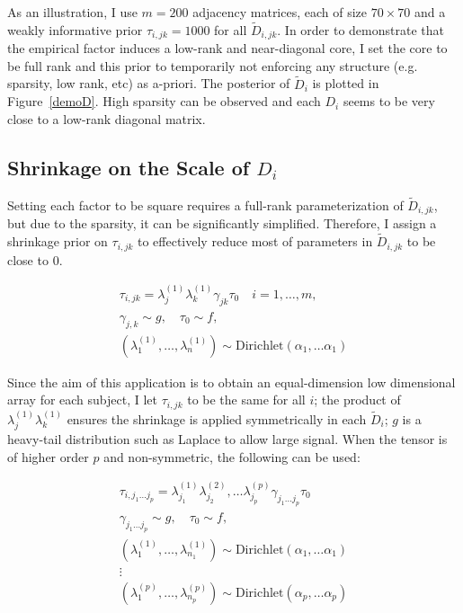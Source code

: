 \documentclass[10pt]{article}
\newcommand{\be}{\begin{equation}\begin{aligned}}
\newcommand{\ee}{\end{aligned}\end{equation}}
\begin{document}
As an illustration, I use $m=200$ adjacency matrices, each of size $70 \times 70$ and a weakly informative prior $\tau_{i,jk}=1000$ for all $\tilde D_{i,jk}$. In order to demonstrate that the empirical factor induces a low-rank and near-diagonal core, I set the core to be full rank and this prior to temporarily not enforcing any structure (e.g. sparsity, low rank, etc) as a-priori. The posterior of $\tilde D_i$ is plotted in Figure~\ref{demoD}. High sparsity can be observed and each $D_i$ seems to be very close to a low-rank diagonal matrix.

\subsection{Shrinkage on the Scale of $D_i$}

Setting each factor to be square requires a full-rank parameterization of $\tilde D_{i,jk}$, but due to the sparsity, it can be significantly simplified. Therefore, I assign a shrinkage prior on $\tau_{i,jk}$ to effectively reduce most of parameters in $\tilde D_{i,jk}$ to be close to $0$.

\be
\tau_{i,jk}= \lambda^{(1)}_j \lambda^{(1)}_k \gamma_{jk}\tau_0 \quad i=1,\ldots,m,\\
\gamma_{j,k} \sim g, \quad \tau_0 \sim f,\\
(\lambda^{(1)}_1,\ldots, \lambda^{(1)}_n) \sim \text{Dirichlet} (\alpha_1, \ldots \alpha_1)
\ee

Since the aim of this application is to obtain an equal-dimension low dimensional array for each subject, I let $\tau_{i,jk}$ to be the same for all $i$; the product of $\lambda^{(1)}_j \lambda^{(1)}_k$ ensures the shrinkage is applied symmetrically in each $\tilde D_i$; $g$ is a heavy-tail distribution such as Laplace to allow large signal. When the tensor is of higher order $p$ and non-symmetric, the following can be used:

\be
\tau_{i,j_1\ldots j_p}= \lambda^{(1)}_{j_1} \lambda^{(2)}_{j_2}, \ldots \lambda^{(p)}_{j_p}\gamma_{j_1\ldots j_p} \tau_0\\
\gamma_{j_1\ldots j_p} \sim g, \quad \tau_0 \sim f,\\
(\lambda^{(1)}_1,\ldots, \lambda^{(1)}_{n_1}) \sim \text{Dirichlet} (\alpha_1, \ldots \alpha_1)\\
\vdots\\
(\lambda^{(p)}_1,\ldots, \lambda^{(p)}_{n_p}) \sim \text{Dirichlet} (\alpha_p, \ldots \alpha_p)
\ee

\end{document}

